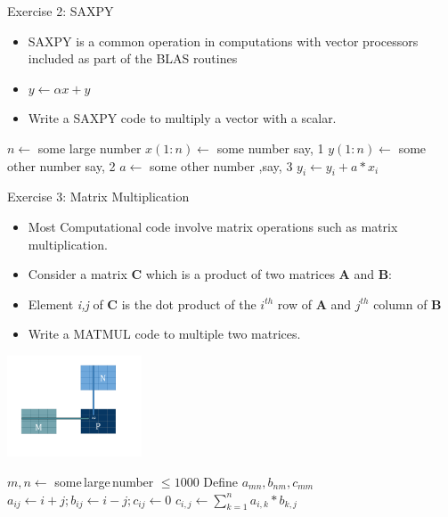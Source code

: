 \documentclass[c,mathserif,compress,xcolor=svgnames]{beamer}
\begin{document}
\begin{frame}{Exercise 2: SAXPY}
  \begin{itemize}
    \item SAXPY is a common operation in computations with vector processors included as part of the BLAS routines
    \item[] $y\leftarrow \alpha x + y$
    \item Write a SAXPY code to multiply a vector with a scalar.
  \end{itemize}
  \begin{algorithm}[H]
    \caption{Pseudo Code for SAXPY}
    \begin{algorithmic}
      \State $n \gets$ some large number
      \State $x(1:n) \gets$ some number say, 1
      \State $y(1:n) \gets$ some other number say, 2
      \State $a \gets$ some other number ,say, 3
      \State $y_i \gets y_i + a * x_i$
      \EndDo
    \end{algorithmic}
  \end{algorithm}
\end{frame}

\begin{frame}[allowframebreaks]{Exercise 3: Matrix Multiplication}
  \begin{itemize}
    \item Most Computational code involve matrix operations such as matrix multiplication.
    \item Consider a matrix {\bf C} which is a product of two matrices {\bf A} and {\bf B}:
    \item[] Element {\it i,j} of {\bf C} is the dot product of the $i^{th}$ row of {\bf A} and $j^{th}$ column of {\bf B}
    \item Write a MATMUL code to multiple two matrices.
  \end{itemize}
  \begin{center}
    \includegraphics[width=0.3\textwidth]{./matmul}
  \end{center}

  \begin{algorithm}[H]
    \caption{Pseudo Code for MATMUL}
    \begin{algorithmic}
      \State $m,n \gets$ some\,large\,number $\le 1000$
      \State Define $a_{mn}, b_{nm}, c_{mm}$
      \State $a_{ij} \gets i+j; b_{ij} \gets i-j; c_{ij} \gets 0$
      \State $c_{i,j} \gets \sum^{n}_{k=1} a_{i,k}*b_{k,j}$
      \EndDo
      \EndDo
    \end{algorithmic}
  \end{algorithm}
\end{frame}
\end{document}
